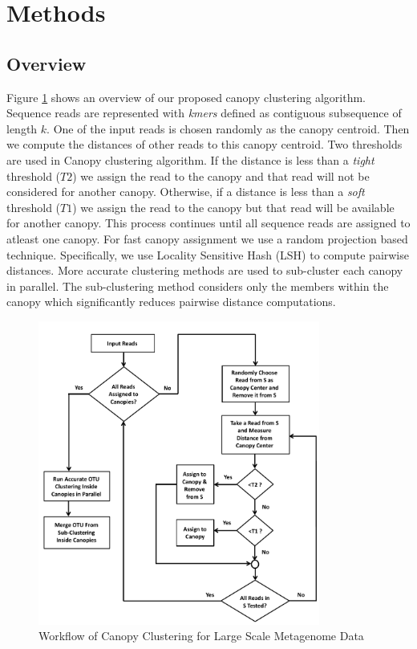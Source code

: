 \documentclass[10pt, conference, compsocconf]{IEEEtran}
\begin{document}

\section{Methods}
\label{sec:Methods}
\subsection{\textbf{Overview}}


Figure \ref{fig:flowchart} shows an overview of our 
proposed canopy clustering algorithm.  Sequence reads are represented with \textit{kmers} defined as contiguous subsequence of 
length $k$. One of the input reads is chosen randomly 
as the canopy centroid. Then we compute the distances of other reads to 
this canopy centroid. Two thresholds are used in Canopy clustering algorithm. If the 
distance is less than a \emph{tight} threshold ($T2$) we assign the read to the canopy and that
read will not be considered for another canopy. Otherwise, if a distance is less than a \emph{soft} threshold ($T1$) we assign the 
read to the canopy but that read will be available for another 
canopy. This process continues until all sequence reads are
assigned to atleast one canopy. For fast canopy assignment we use a random projection based 
technique. Specifically, we use Locality Sensitive Hash (LSH) to compute pairwise distances. More accurate clustering methods are 
used to sub-cluster each canopy in parallel. The sub-clustering method considers only the members within 
the canopy which significantly 
reduces pairwise distance computations.

\begin{figure}
	\centering
	\includegraphics[width=\linewidth,height=10cm]{flowchart.pdf}	
	\caption{Workflow of Canopy Clustering for Large Scale Metagenome Data}
	\label{fig:flowchart}
\end{figure}
\end{document}
